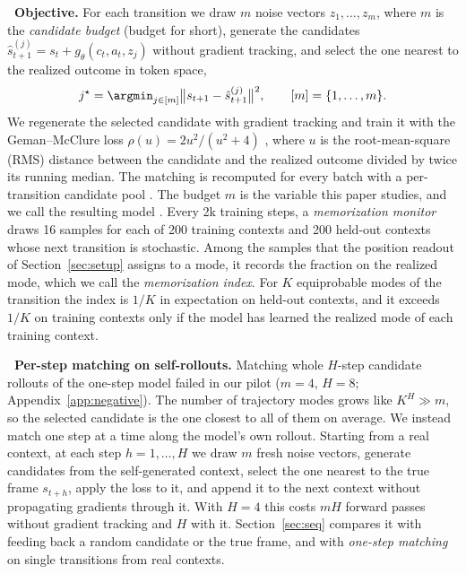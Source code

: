 \leavevmode{}\textbf{\thesubsection\ Objective.}
\label{sec:objective}
For each transition we draw $m$ noise vectors $z_1, \dots, z_m$, where $m$ is the \emph{candidate budget} (budget for short), generate the candidates $\hat{s}_{t+1}^{(j)} = s_t + g_\theta(c_t, a_t, z_j)$ without gradient tracking, and select the one nearest to the realized outcome in token space,
\begin{equation}
j^\star = \argmin_{j \in [m]} \big\| s_{t+1} - \hat{s}_{t+1}^{(j)} \big\|^2 , \qquad [m] = \{1, \dots, m\}.
\label{eq:match}
\end{equation}
We regenerate the selected candidate with gradient tracking and train it with the Geman--McClure loss $\rho(u) = 2u^2/(u^2+4)$ \citep{geman1987statistical}, where $u$ is the root-mean-square (RMS) distance between the candidate and the realized outcome divided by twice its running median. The matching is recomputed for every batch with a per-transition candidate pool \citep[as in WIMLE;][]{aghabozorgi2026wimle}. The budget $m$ is the variable this paper studies, and we call the resulting model \imlewm{}. Every 2k training steps, a \emph{memorization monitor} draws 16 samples for each of 200 training contexts and 200 held-out contexts whose next transition is stochastic. Among the samples that the position readout of Section~\ref{sec:setup} assigns to a mode, it records the fraction on the realized mode, which we call the \emph{memorization index}. For $K$ equiprobable modes of the transition the index is $1/K$ in expectation on held-out contexts, and it exceeds $1/K$ on training contexts only if the model has learned the realized mode of each training context.

\leavevmode{}\textbf{\thesubsection\ Per-step matching on self-rollouts.}
\label{sec:seqmatch}
Matching whole $H$-step candidate rollouts of the one-step model failed in our pilot ($m{=}4$, $H{=}8$; Appendix~\ref{app:negative}). The number of trajectory modes grows like $K^H \gg m$, so the selected candidate is the one closest to all of them on average. We instead match one step at a time along the model's own rollout. Starting from a real context, at each step $h = 1,\dots,H$ we draw $m$ fresh noise vectors, generate candidates from the self-generated context, select the one nearest to the true frame $s_{t+h}$, apply the loss to it, and append it to the next context without propagating gradients through it. With $H{=}4$ this costs $mH$ forward passes without gradient tracking and $H$ with it. Section~\ref{sec:seq} compares it with feeding back a random candidate or the true frame, and with \emph{one-step matching} on single transitions from real contexts.

